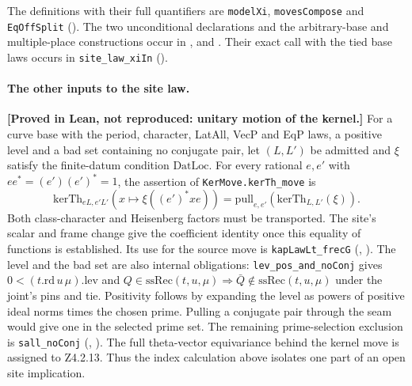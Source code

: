 The definitions with their full quantifiers are \nolinkurl{modelXi},
\nolinkurl{movesCompose} and \nolinkurl{EqOffSplit}
().
The two unconditional declarations and the arbitrary-base and
multiple-place constructions occur in
,
 and
.
Their exact call with the tied base laws occurs in
\nolinkurl{site_law_xiIn}
().

\paragraph{The other inputs to the site law.}
\textbf{[Proved in Lean, not reproduced: unitary motion of the kernel.]}
For a curve base with the period, character, LatAll, VecP and EqP laws,
a positive level and a bad set containing no conjugate pair, let
\((L,L')\) be admitted and \(\xi\) satisfy the finite-datum condition
\(\mathrm{DatLoc}\). For every rational \(e,e'\) with
\(ee^*=(e')(e')^*=1\), the assertion of \nolinkurl{KerMove.kerTh_move} is
\[
 \mathrm{kerTh}_{eL,e'L'}(x\mapsto\xi((e')^*xe))
   =\mathrm{pull}_{e,e'}(\mathrm{kerTh}_{L,L'}(\xi)).
\]
Both class-character and Heisenberg factors must be transported. The
site's scalar and frame change give the coefficient identity once this
equality of functions is established. Its use for the source move is
\nolinkurl{kapLawLt_frecG}
(,
).
The level and the bad set are also internal obligations:
\nolinkurl{lev_pos_and_noConj} gives
\(0<(t.\mathrm{rd}\,u\,\mu).\mathrm{lev}\) and
\(Q\in\mathrm{ssRec}(t,u,\mu)\Rightarrow
\bar Q\notin\mathrm{ssRec}(t,u,\mu)\) under the joint's pins and tie.
Positivity follows by expanding the level as powers of positive
ideal norms times the chosen prime. Pulling a conjugate pair through
the seam would give one in the selected prime set. The remaining
prime-selection exclusion is \nolinkurl{sall_noConj}
(,
).
The full theta-vector equivariance behind the kernel move is assigned to
Z4.2.13. Thus the index calculation above isolates one part of an open
site implication.


